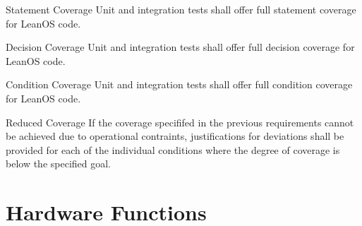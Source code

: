  {Statement Coverage}{%
Unit and integration tests shall offer full statement coverage for LeanOS code.%
}{}%

 {Decision Coverage}{%
Unit and integration tests shall offer full decision coverage for LeanOS code.%
}{}%

 {Condition Coverage}{%
Unit and integration tests shall offer full condition coverage for LeanOS code.%
}{}%

 {Reduced Coverage}{%
If the coverage specififed in the previous requirements cannot be achieved %
due to operational contraints, justifications for deviations shall be provided %
for each of the individual conditions where the degree of coverage is below %
the specified goal. %
}{}%



\section{Hardware Functions}








